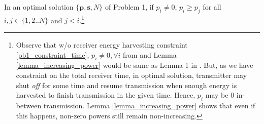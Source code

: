 
\begin{lemma}
In an optimal solution $\{\bm{p},\bm{s},N\}$ of Problem 1, if $p_i\neq 0$, $p_i\ge p_j$ for all $i,j\in \{1,2..N\}$ and $j<i$.\footnote{\label{note1}Observe that w/o receiver energy harvesting constraint \eqref{pb1_constraint_time}, $p_i\neq 0,\forall i$ from \cite{Yang} and Lemma \ref{lemma_increasing_power} would be same as Lemma 1 in \cite{Yang}. But, as we have constraint on the total receiver time, in optimal solution, transmitter may shut \textit{off} for some time and resume transmission when enough energy is harvested to finish transmission in the given time. Hence, $p_i$ may be $0$ in-between transmission. Lemma \ref{lemma_increasing_power} shows that even if this happens, non-zero powers still remain non-increasing.}  
\label{lemma_increasing_power}
\end{lemma}
